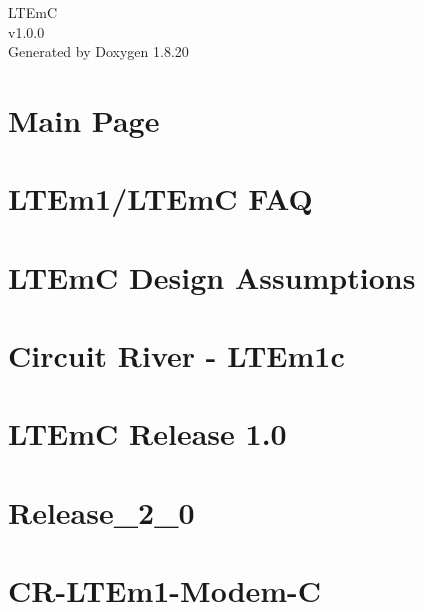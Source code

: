 \let\mypdfximage\pdfximage\def\pdfximage{\immediate\mypdfximage}\documentclass[twoside]{book}
\newcommand{\+}{\discretionary{\mbox{\scriptsize$\hookleftarrow$}}{}{}}
\newcommand{\clearemptydoublepage}{%
  \newpage{\pagestyle{empty}\cleardoublepage}%
}
\begin{document}
\hypersetup{pageanchor=false,
             bookmarksnumbered=true,
             pdfencoding=unicode
            }
\begin{titlepage}
\vspace*{7cm}
\begin{center}%
{\Large L\+T\+EmC \\[1ex]\large v1.\+0.\+0 }\\
\vspace*{1cm}
{\large Generated by Doxygen 1.8.20}\\
\end{center}
\end{titlepage}
\clearemptydoublepage
{}
\tableofcontents
\clearemptydoublepage
{}
\hypersetup{pageanchor=true}

\chapter{Main Page}
\label{index}\hypertarget{index}{}
\chapter{L\+T\+Em1/\+L\+T\+EmC F\+AQ}
\label{md__l_t_em1-_f_a_q}

\chapter{L\+T\+EmC Design Assumptions}
\label{md__l_t_em_c__design__assumptions}

\chapter{Circuit River -\/ L\+T\+Em1c}
\label{md__r_e_a_d_m_e}

\chapter{L\+T\+EmC Release 1.0}
\label{md__release_1_0}

\chapter{Release\+\_\+2\+\_\+0}
\label{md__release_2_0}

\chapter{C\+R-\/\+L\+T\+Em1-\/\+Modem-\/C}
\label{md_tests__l_t_em_c-1-platform__r_e_a_d_m_e}

\end{document}
